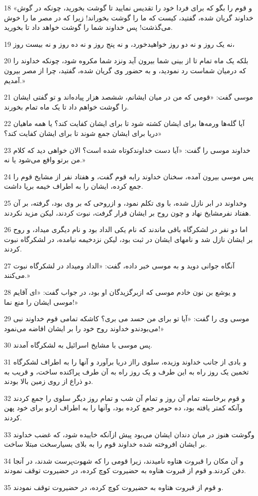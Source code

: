 \par 18 «و قوم را بگو که برای فردا خود را تقدیس نمایید تا گوشت بخورید، چونکه در گوش خداوند گریان شده، گفتید، کیست که ما را گوشت بخوراند! زیرا که در مصر ما را خوش می‌گذشت! پس خداوند شما را گوشت خواهد داد تا بخورید.
\par 19 نه یک روز و نه دو روز خواهیدخورد، و نه پنج روز و نه ده روز و نه بیست روز،
\par 20 بلکه یک ماه تمام تا از بینی شما بیرون آید ونزد شما مکروه شود، چونکه خداوند را که درمیان شماست رد نمودید، و به حضور وی گریان شده، گفتید، چرا از مصر بیرون آمدیم.»
\par 21 موسی گفت: «قومی که من در میان ایشانم، ششصد هزار پیاده‌اند و تو گفتی ایشان را گوشت خواهم داد تا یک ماه تمام بخورند.
\par 22 آیا گله‌ها ورمه‌ها برای ایشان کشته شود تا برای ایشان کفایت کند؟ یا همه ماهیان دریا برای ایشان جمع شوند تا برای ایشان کفایت کند؟»
\par 23 خداوند موسی را گفت: «آیا دست خداوندکوتاه شده است؟ الان خواهی دید که کلام من برتو واقع می‌شود یا نه.»
\par 24 پس موسی بیرون آمده، سخنان خداوند رابه قوم گفت، و هفتاد نفر از مشایخ قوم را جمع کرده، ایشان را به اطراف خیمه برپا داشت.
\par 25 وخداوند در ابر نازل شده، با وی تکلم نمود، و ازروحی که بر وی بود، گرفته، بر آن هفتاد نفرمشایخ نهاد و چون روح بر ایشان قرار گرفت، نبوت کردند، لیکن مزید نکردند.
\par 26 اما دو نفر در لشکرگاه باقی ماندند که نام یکی الداد بود و نام دیگری میداد، و روح بر ایشان نازل شد و نامهای ایشان در ثبت بود، لیکن نزدخیمه نیامده، در لشکرگاه نبوت کردند.
\par 27 آنگاه جوانی دوید و به موسی خبر داده، گفت: «الداد ومیداد در لشکرگاه نبوت می‌کنند.»
\par 28 و یوشع بن نون خادم موسی که ازبرگزیدگان او بود، در جواب گفت: «ای آقایم موسی ایشان را منع نما!»
\par 29 موسی وی را گفت: «آیا تو برای من حسد می بری؟ کاشکه تمامی قوم خداوند نبی می‌بودندو خداوند روح خود را بر ایشان افاضه می‌نمود!»
\par 30 پس موسی با مشایخ اسرائیل به لشکرگاه آمدند.
\par 31 و بادی از جانب خداوند وزیده، سلوی رااز دریا برآورد و آنها را به اطراف لشکرگاه تخمین یک روز راه به این طرف و یک روز راه به آن طرف پراکنده ساخت، و قریب به دو ذراع از روی زمین بالا بودند.
\par 32 و قوم برخاسته تمام آن روز و تمام آن شب و تمام روز دیگر سلوی را جمع کردند وآنکه کمتر یافته بود، ده حومر جمع کرده بود، وآنها را به اطراف اردو برای خود پهن کردند.
\par 33 وگوشت هنوز در میان دندان ایشان می‌بود پیش ازآنکه خاییده شود، که غضب خداوند بر ایشان افروخته شده خداوند قوم را به بلای بسیارسخت مبتلا ساخت.
\par 34 و آن مکان را قبروت هتاوه نامیدند، زیرا قومی را که شهوت‌پرست شدند، در آنجا دفن کردند.و قوم از قبروت هتاوه به حضیروت کوچ کرده، در حضیروت توقف نمودند.
\par 35 و قوم از قبروت هتاوه به حضیروت کوچ کرده، در حضیروت توقف نمودند.
 

